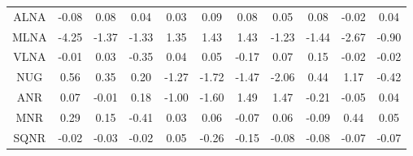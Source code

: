 \begin{longtable}{ | c || c | c | c | c | c | c | c | c | c || c |}
ALNA &  \cellcolor[HTML]{FFFFFF} -0.08 &  \cellcolor[HTML]{FFFFFF} 0.08 &  \cellcolor[HTML]{FFFFFF} 0.04 &  \cellcolor[HTML]{FFFFFF} 0.03 &  \cellcolor[HTML]{FFFFFF} 0.09 &  \cellcolor[HTML]{FFFFFF} 0.08 &  \cellcolor[HTML]{FFFFFF} 0.05 &  \cellcolor[HTML]{FFFFFF} 0.08 &  \cellcolor[HTML]{FFFFFF} -0.02 &  \cellcolor[HTML]{FFFFFF} 0.04 \\
MLNA &  \cellcolor[HTML]{FF9797} -4.25 &  \cellcolor[HTML]{FFDFDF} -1.37 &  \cellcolor[HTML]{FFDFDF} -1.33 &  \cellcolor[HTML]{DFDFFF} 1.35 &  \cellcolor[HTML]{DFDFFF} 1.43 &  \cellcolor[HTML]{DFDFFF} 1.43 &  \cellcolor[HTML]{FFDFDF} -1.23 &  \cellcolor[HTML]{FFD7D7} -1.44 &  \cellcolor[HTML]{FFBFBF} -2.67 &  \cellcolor[HTML]{FFE7E7} -0.90 \\
VLNA &  \cellcolor[HTML]{FFFFFF} -0.01 &  \cellcolor[HTML]{FFFFFF} 0.03 &  \cellcolor[HTML]{FFF7F7} -0.35 &  \cellcolor[HTML]{FFFFFF} 0.04 &  \cellcolor[HTML]{FFFFFF} 0.05 &  \cellcolor[HTML]{FFF7F7} -0.17 &  \cellcolor[HTML]{FFFFFF} 0.07 &  \cellcolor[HTML]{FFFFFF} 0.15 &  \cellcolor[HTML]{FFFFFF} -0.02 &  \cellcolor[HTML]{FFFFFF} -0.02 \\
NUG &  \cellcolor[HTML]{EFEFFF} 0.56 &  \cellcolor[HTML]{F7F7FF} 0.35 &  \cellcolor[HTML]{F7F7FF} 0.20 &  \cellcolor[HTML]{FFDFDF} -1.27 &  \cellcolor[HTML]{FFD7D7} -1.72 &  \cellcolor[HTML]{FFD7D7} -1.47 &  \cellcolor[HTML]{FFCFCF} -2.06 &  \cellcolor[HTML]{F7F7FF} 0.44 &  \cellcolor[HTML]{DFDFFF} 1.17 &  \cellcolor[HTML]{FFF7F7} -0.42 \\
ANR &  \cellcolor[HTML]{FFFFFF} 0.07 &  \cellcolor[HTML]{FFFFFF} -0.01 &  \cellcolor[HTML]{F7F7FF} 0.18 &  \cellcolor[HTML]{FFE7E7} -1.00 &  \cellcolor[HTML]{FFD7D7} -1.60 &  \cellcolor[HTML]{D7D7FF} 1.49 &  \cellcolor[HTML]{D7D7FF} 1.47 &  \cellcolor[HTML]{FFF7F7} -0.21 &  \cellcolor[HTML]{FFFFFF} -0.05 &  \cellcolor[HTML]{FFFFFF} 0.04 \\
MNR &  \cellcolor[HTML]{F7F7FF} 0.29 &  \cellcolor[HTML]{FFFFFF} 0.15 &  \cellcolor[HTML]{FFF7F7} -0.41 &  \cellcolor[HTML]{FFFFFF} 0.03 &  \cellcolor[HTML]{FFFFFF} 0.06 &  \cellcolor[HTML]{FFFFFF} -0.07 &  \cellcolor[HTML]{FFFFFF} 0.06 &  \cellcolor[HTML]{FFFFFF} -0.09 &  \cellcolor[HTML]{F7F7FF} 0.44 &  \cellcolor[HTML]{FFFFFF} 0.05 \\
SQNR &  \cellcolor[HTML]{FFFFFF} -0.02 &  \cellcolor[HTML]{FFFFFF} -0.03 &  \cellcolor[HTML]{FFFFFF} -0.02 &  \cellcolor[HTML]{FFFFFF} 0.05 &  \cellcolor[HTML]{FFF7F7} -0.26 &  \cellcolor[HTML]{FFFFFF} -0.15 &  \cellcolor[HTML]{FFFFFF} -0.08 &  \cellcolor[HTML]{FFFFFF} -0.08 &  \cellcolor[HTML]{FFFFFF} -0.07 &  \cellcolor[HTML]{FFFFFF} -0.07 \\

\end{longtable}
